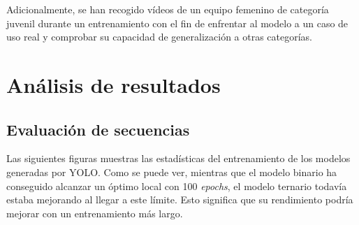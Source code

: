\documentclass[12pt]{report} %
\begin{document}
    Adicionalmente, se han recogido vídeos de un equipo femenino de categoría
    juvenil durante un entrenamiento con el fin de enfrentar al modelo a un
    caso de uso real y comprobar su capacidad de generalización a otras categorías.
%
%
%
%
%
%

    \chapter{Análisis de resultados}
    \label{chap:resultados}

    \section{Evaluación de secuencias}

    Las siguientes figuras muestras las estadísticas del entrenamiento de los
    modelos generadas por YOLO. Como se puede ver, mientras que el modelo
    binario ha conseguido alcanzar un óptimo local con 100 \textit{epochs}, el
    modelo ternario todavía estaba mejorando al llegar a este límite. Esto
    significa que su rendimiento podría mejorar con un entrenamiento más largo.
\end{document}

